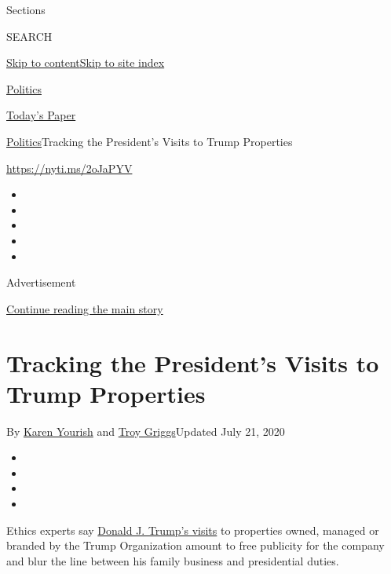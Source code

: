 Sections

SEARCH

\protect\hyperlink{site-content}{Skip to
content}\protect\hyperlink{site-index}{Skip to site index}

\href{https://www.nytimes3xbfgragh.onion/section/politics}{Politics}

\href{https://myaccount.nytimes3xbfgragh.onion/auth/login?response_type=cookie\&client_id=vi}{}

\href{https://www.nytimes3xbfgragh.onion/section/todayspaper}{Today's
Paper}

\href{/section/politics}{Politics}\textbar{}Tracking the President's
Visits to Trump Properties

\url{https://nyti.ms/2oJaPYV}

\begin{itemize}
\item
\item
\item
\item
\item
\end{itemize}

Advertisement

\protect\hyperlink{after-top}{Continue reading the main story}

\hypertarget{tracking-the-presidents-visits-to-trump-properties}{%
\section{Tracking the President's Visits to Trump
Properties}\label{tracking-the-presidents-visits-to-trump-properties}}

By \href{https://www.nytimes3xbfgragh.onion/by/karen-yourish}{Karen
Yourish} and
\href{https://www.nytimes3xbfgragh.onion/by/troy-griggs}{Troy
Griggs}Updated July 21, 2020

\begin{itemize}
\item
\item
\item
\item
\end{itemize}

Ethics experts say
\href{https://www.nytimes3xbfgragh.onion/2017/03/26/us/politics/donald-trump-brand-properties.html}{Donald
J. Trump's visits} to properties owned, managed or branded by the Trump
Organization amount to free publicity for the company and blur the line
between his family business and presidential duties.

